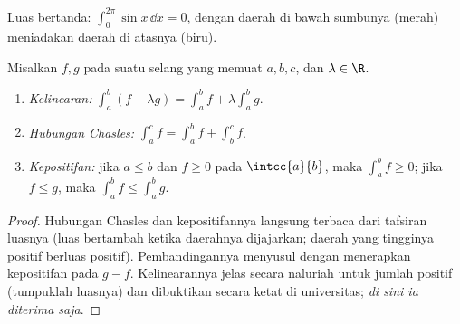 \begin{omfigure}

{\small Luas bertanda: $\int_0^{2\pi} \sin x\,\dd x = 0$, dengan daerah
di bawah sumbunya (merah) meniadakan daerah di atasnya (biru).}
\end{omfigure}

\begin{proposition}\label{prop:g12:integ:properties}
Misalkan $f, g$  pada suatu selang yang memuat $a, b, c$, dan
$\lambda \in \R$.
\begin{enumerate}
  \item \emph{Kelinearan:}
        $\displaystyle\int_a^b (f + \lambda g) = \int_a^b f + \lambda \int_a^b g$.
  \item \emph{Hubungan Chasles:}
        $\displaystyle\int_a^c f = \int_a^b f + \int_b^c f$.
  \item \emph{Kepositifan:} jika $a \leq b$ dan $f \geq 0$ pada $\intcc{a}{b}$,
        maka $\displaystyle\int_a^b f \geq 0$; jika $f \leq g$, maka
        $\displaystyle\int_a^b f \leq \int_a^b g$.
\end{enumerate}
\end{proposition}

\begin{proof}
Hubungan Chasles dan kepositifannya langsung terbaca dari tafsiran luasnya
(luas bertambah ketika daerahnya dijajarkan; daerah yang tingginya positif
berluas positif). Pembandingannya menyusul dengan menerapkan kepositifan pada
$g - f$. Kelinearannya jelas secara naluriah untuk jumlah  positif
(tumpuklah luasnya) dan dibuktikan secara ketat di universitas;
\emph{di sini ia diterima saja}.
\end{proof}

